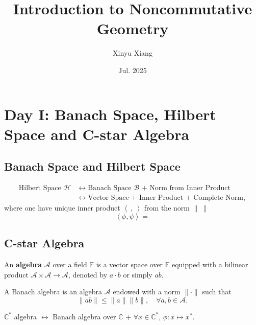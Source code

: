 \documentclass[10pt]{article}
\title{\textbf{Introduction to Noncommutative Geometry}}
\author{Xinyu Xiang}
\date{Jul. 2025}
\begin{document}
\maketitle

\section{Day I: Banach Space, Hilbert Space and C-star Algebra}

\subsection{Banach Space and Hilbert Space}
\begin{equation*}
  \begin{aligned}
    \text{Hilbert Space } \mathcal{H} & \longleftrightarrow \text{Banach Space $\mathcal{B}$ + Norm from Inner Product} \\
    & \longleftrightarrow \text{Vector Space + Inner Product + Complete Norm},
  \end{aligned}
\end{equation*}
where one have unique inner product $\left< ~,~ \right>$ from the norm $\| ~ \|$
\begin{equation*}
  \left< \phi, \psi \right> =
\end{equation*}

\subsection{C-star Algebra}

\begin{definition}[Algebra]
  An \textbf{algebra} $\mathcal{A}$ over a field $\mathbb{F}$ is a vector space over $\mathbb{F}$ equipped with a bilinear product $\mathcal{A} \times \mathcal{A} \to \mathcal{A}$, denoted by $a \cdot b$ or simply $ab$.
\end{definition}

\begin{definition}
  A Banach algebra is an algebra $ \mathcal{A}$ endowed with a norm $\| \cdot \|$ such that
  \begin{equation*}
    \| ab \| \leq \| a \| \| b \|, \quad \forall a, b \in \mathcal{A}.
  \end{equation*}
\end{definition}

\begin{definition}
  $ \mathbb{C}^{*}$ algebra $\longleftrightarrow$ Banach algebra over $ \mathbb{C}$ + $\forall x \in \mathbb{C}^{*}$, $ \phi: x \mapsto x^{*}$.
\end{definition}

\begin{example}[Matrix]

\end{example}
\begin{example}

\end{example}

\label{LastPage}
\end{document}

